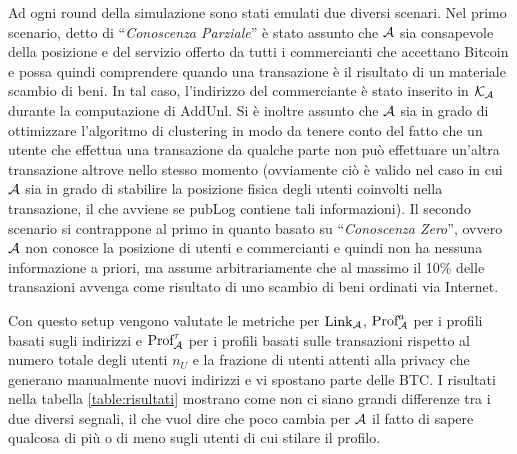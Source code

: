 Ad ogni round della simulazione sono stati emulati due diversi scenari.
Nel primo scenario, detto di ``\emph{Conoscenza Parziale}'' è stato assunto che $\mathcal{A}$ sia consapevole della posizione e del servizio offerto da tutti i commercianti che accettano Bitcoin e possa quindi comprendere quando una transazione è il risultato di un materiale scambio di beni. In tal caso, l'indirizzo del commerciante è stato inserito in $\mathcal{K}_\mathcal{A}$ durante la computazione di AddUnl. Si è inoltre assunto che $\mathcal{A}$ sia in grado di ottimizzare l'algoritmo di clustering in modo da tenere conto del fatto che un utente che effettua una transazione da qualche parte non può effettuare un'altra transazione altrove nello stesso momento (ovviamente ciò è valido nel caso in cui $\mathcal{A}$ sia in grado di stabilire la posizione fisica degli utenti coinvolti nella transazione, il che avviene se pubLog contiene tali informazioni).
Il secondo scenario si contrappone al primo in quanto basato su ``\emph{Conoscenza Zero}'', ovvero $\mathcal{A}$ non conosce la posizione di utenti e commercianti e quindi non ha nessuna informazione a priori, ma assume arbitrariamente che al massimo il 10\% delle transazioni avvenga come risultato di uno scambio di beni ordinati via Internet.

Con questo setup vengono valutate le metriche per $\text{Link}_{\mathcal{A}}$, $\text{Prof}^a_{\mathcal{A}}$ per i profili basati sugli indirizzi e $\text{Prof}^\tau_{\mathcal{A}}$ per i profili basati sulle transazioni rispetto al numero totale degli utenti $n_U$ e la frazione di utenti attenti alla privacy che generano manualmente nuovi indirizzi e vi spostano parte delle BTC.
I risultati nella tabella \ref{table:risultati} mostrano come non ci siano grandi differenze tra i due diversi segnali, il che vuol dire che poco cambia per $\mathcal{A}$ il fatto di sapere qualcosa di più o di meno sugli utenti di cui stilare il profilo.

